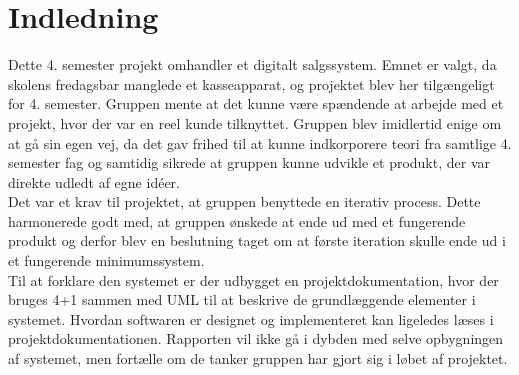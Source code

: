 \chapter{Indledning}
Dette 4. semester projekt omhandler et digitalt salgssystem. Emnet er valgt, da skolens fredagsbar manglede et kasseapparat, og projektet blev her tilgængeligt for 4. semester. Gruppen mente at det kunne være spændende at arbejde med et projekt, hvor der var en reel kunde tilknyttet. Gruppen blev imidlertid enige om at gå sin egen vej, da det gav frihed til at kunne indkorporere teori fra samtlige 4. semester fag og samtidig sikrede at gruppen kunne udvikle et produkt, der var direkte udledt af egne idéer. \\

Det var et krav til projektet, at gruppen benyttede en iterativ process. Dette harmonerede godt med, at gruppen ønskede at ende ud med et fungerende produkt og derfor blev en beslutning taget om at første iteration skulle ende ud i et fungerende minimumssystem. \\

Til at forklare den systemet er der udbygget en projektdokumentation, hvor der bruges 4+1 sammen med UML til at beskrive de grundlæggende elementer i systemet. Hvordan softwaren er designet og implementeret kan ligeledes læses i projektdokumentationen.
Rapporten vil ikke gå i dybden med selve opbygningen af systemet, men fortælle om de tanker gruppen har gjort sig i løbet af projektet.